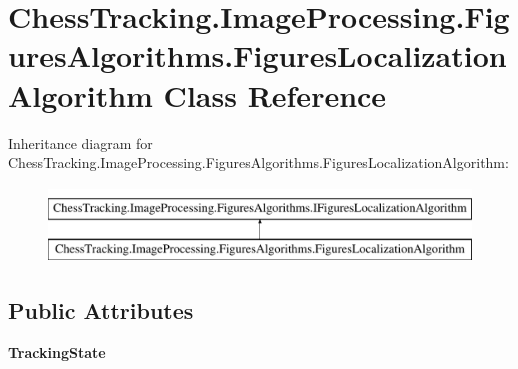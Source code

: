 \hypertarget{class_chess_tracking_1_1_image_processing_1_1_figures_algorithms_1_1_figures_localization_algorithm}{}\section{Chess\+Tracking.\+Image\+Processing.\+Figures\+Algorithms.\+Figures\+Localization\+Algorithm Class Reference}
\label{class_chess_tracking_1_1_image_processing_1_1_figures_algorithms_1_1_figures_localization_algorithm}
Inheritance diagram for Chess\+Tracking.\+Image\+Processing.\+Figures\+Algorithms.\+Figures\+Localization\+Algorithm\+:\begin{figure}[H]
\begin{center}
\leavevmode
\includegraphics[height=2.000000cm]{class_chess_tracking_1_1_image_processing_1_1_figures_algorithms_1_1_figures_localization_algorithm}
\end{center}
\end{figure}
\subsection*{Public Attributes}
\begin{DoxyCompactItemize}
\item 
\mbox{\label{class_chess_tracking_1_1_image_processing_1_1_figures_algorithms_1_1_figures_localization_algorithm_a39ca26da7e0ba1b2f4f554d3e306617f}} 
{\bfseries Tracking\+State}
\end{DoxyCompactItemize}

